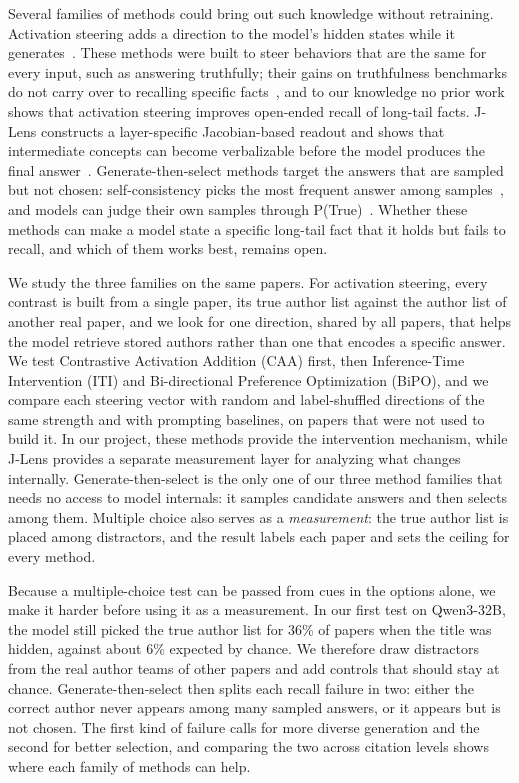 \documentclass[sigconf,nonacm]{acmart}
\begin{document}
Several families of methods could bring out such knowledge without retraining. Activation steering adds a direction to the model's hidden states while it generates~\cite{rimsky2024caa,li2023iti,cao2024bipo}. These methods were built to steer behaviors that are the same for every input, such as answering truthfully; their gains on truthfulness benchmarks do not carry over to recalling specific facts~\cite{gema2025decore}, and to our knowledge no prior work shows that activation steering improves open-ended recall of long-tail facts. J-Lens constructs a layer-specific Jacobian-based readout and shows that intermediate concepts can become verbalizable before the model produces the final answer~\cite{gurnee2026verbalizable}. Generate-then-select methods target the answers that are sampled but not chosen: self-consistency picks the most frequent answer among samples~\cite{wang2023selfconsistency}, and models can judge their own samples through P(True)~\cite{kadavath2022know}. Whether these methods can make a model state a specific long-tail fact that it holds but fails to recall, and which of them works best, remains open.

We study the three families on the same papers. For activation steering, every contrast is built from a single paper, its true author list against the author list of another real paper, and we look for one direction, shared by all papers, that helps the model retrieve stored authors rather than one that encodes a specific answer. We test Contrastive Activation Addition (CAA) first, then Inference-Time Intervention (ITI) and Bi-directional Preference Optimization (BiPO), and we compare each steering vector with random and label-shuffled directions of the same strength and with prompting baselines, on papers that were not used to build it. In our project, these methods provide the intervention mechanism, while J-Lens provides a separate measurement layer for analyzing what changes internally. Generate-then-select is the only one of our three method families that needs no access to model internals: it samples candidate answers and then selects among them. Multiple choice also serves as a \emph{measurement}: the true author list is placed among distractors, and the result labels each paper and sets the ceiling for every method.

Because a multiple-choice test can be passed from cues in the options alone, we make it harder before using it as a measurement. In our first test on Qwen3-32B, the model still picked the true author list for 36\% of papers when the title was hidden, against about 6\% expected by chance. We therefore draw distractors from the real author teams of other papers and add controls that should stay at chance. Generate-then-select then splits each recall failure in two: either the correct author never appears among many sampled answers, or it appears but is not chosen. The first kind of failure calls for more diverse generation and the second for better selection, and comparing the two across citation levels shows where each family of methods can help.
\end{document}
